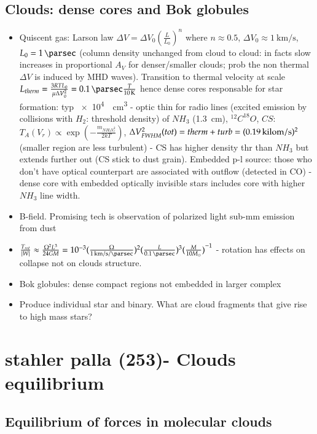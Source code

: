 \documentclass[main.tex]{subfiles}
\begin{document}
\section{Clouds: dense cores and Bok globules}
\begin{itemize}
\item Quiscent gas: Larson law $\Delta V=\Delta V_0(\frac{L}{L_0})^n$ where $n\approx0.5$, $\Delta V_0\approx\SI{1}{\kilo\meter\per\second}$, $L_0=\SI{1}{\parsec}$ (column density unchanged from cloud to cloud: in facts slow increases in proportional $A_V$ for denser/smaller clouds; prob the non thermal $\Delta V$ is induced by MHD waves). Transition to thermal velocity at scale $L_{therm}=\frac{3RTL_0}{\mu\Delta V_0^2}=\SI{0.1}{\parsec}\frac{T}{\SI{10}{\kelvin}}$ hence dense cores responsable for star formation: typ \SI{e4}{\per\cubic\cm} - optic thin for radio lines (excited emission by collisions with $H_2$: threshold density) of $NH_3$ (\SI{1.3}{\cm}), $^{12}C^{18}O$, $CS$: $T_A(V_r)\propto\exp{(-\frac{m_{NH_3V_r^2}}{2kT})}$, $\Delta V_{FWHM}^2(tot)=therm+turb=(\SI{0.19}{\\kilo\meter\per\second})^2$ (smaller region are less turbulent) - CS has higher density thr than $NH_3$ but extends further out (CS stick to dust grain). Embedded p-l source: those who don't have optical counterpart are associated with outflow (detected in CO) - dense core with embedded optically invisible stars includes core with higher $NH_3$ line width.
\item B-field. Promising tech is observation of polarized light sub-mm emission from dust
\item $\frac{T_{rot}}{|W|}\approx\frac{\Omega^2 L^3}{24GM}=\num{e-3}(\frac{\Omega}{\SI{1}{\kilo\meter\per\second\per\parsec}})^2(\frac{L}{\SI{0.1}{\parsec}})^3\invers{(\frac{M}{10\msun})}$ - rotation has effects on collapse not on clouds structure.
\item Bok globules: dense compact regions not embedded in larger complex
\item Produce individual star and binary. What are cloud fragments that give rise to high mass stars?
\end{itemize}

\chapter{stahler palla (253)- Clouds equilibrium}

\section{Equilibrium of forces in molecular clouds}
\end{document}
